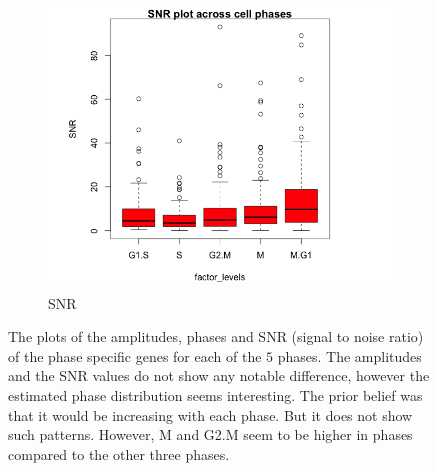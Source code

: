 \documentclass[11pt]{article}
\begin{document}
\begin{figure}[ht]
     \begin{subfigure}[t]{0.5\textwidth}
        \centering
        \includegraphics[height=3in]{../figures/cell_order_R_figs/snr_plot_genes_ipsc.png}
        \caption{SNR}
    \end{subfigure}
    \caption{The plots of the amplitudes, phases and SNR (signal to noise ratio) of the phase specific genes for each of the $5$ phases. The amplitudes and the SNR values do not show any notable difference, however the estimated phase distribution seems interesting. The prior belief was that it would be increasing with each phase. But it does not show such patterns. However, M and G2.M seem to be higher in phases compared to the other three phases.}
 \label{fig:fig4}
 \end{figure}
    
\end{document}
